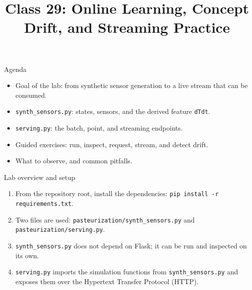 
\usepackage{amssymb}

\title{Class 29: Online Learning, Concept Drift, and Streaming Practice}
\author{\coursename}
\date{}



\frame{\titlepage \coursefooter}

\begin{frame}{Agenda}
\begin{itemize}
\item Goal of the lab: from synthetic sensor generation to a live stream that can be consumed.
\item \texttt{synth\_sensors.py}: states, sensors, and the derived feature \texttt{dTdt}.
\item \texttt{serving.py}: the batch, point, and streaming endpoints.
\item Guided exercises: run, inspect, request, stream, and detect drift.
\item What to observe, and common pitfalls.
\end{itemize}
\coursefooter
\end{frame}

\begin{frame}{Lab overview and setup}
\begin{enumerate}
\item From the repository root, install the dependencies: \texttt{pip install -r requirements.txt}.
\item Two files are used: \texttt{pasteurization/synth\_sensors.py} and \texttt{pasteurization/serving.py}.
\item \texttt{synth\_sensors.py} does not depend on Flask; it can be run and inspected on its own.
\item \texttt{serving.py} imports the simulation functions from \texttt{synth\_sensors.py} and exposes them over the Hypertext Transfer Protocol (HTTP).
\end{enumerate}
\coursefooter
\end{frame}

